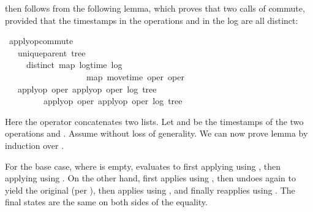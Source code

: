 \documentclass[sigconf]{acmart}
\renewenvironment{isabelle}{%
  \medbreak\noindent%
  \renewcommand{\isanewline}{\\}%
  \begin{minipage}{\columnwidth}%
  \begin{isabellebody}%
  \begin{tabbing}%
}{%
  \end{tabbing}%
  \end{isabellebody}%
  \end{minipage}%
  \medbreak%
}
\renewcommand{\isacartoucheopen}{}
\renewcommand{\isacartoucheclose}{}
\begin{document}
 then follows from the following lemma, which proves that two calls of  commute, provided that the timestamps in the operations and in the log are all distinct:
\begin{isabelle}
\isamarkupfalse%
\ apply{\isacharunderscore}op{\isacharunderscore}commute{}{\isacharcolon}\isanewline
\ \ \ {\isacartoucheopen}unique{\isacharunderscore}parent\ tree{\isacartoucheclose}\isanewline
\ \ \ \ \ {\isacartoucheopen}distinct\ {\isacharparenleft}{\isacharparenleft}map\ log{\isacharunderscore}time\ log{\isacharparenright}\ {\isacharat}\isanewline
\ \ \ \ \ \ \ \ \ \ \ \ \ \ \ \ \ \ \ {\isacharparenleft}map\ move{\isacharunderscore}time\ {\isacharbrackleft}oper{}{\isacharcomma}\ oper{}{\isacharbrackright}{\isacharparenright}{\isacharparenright}{\isacartoucheclose}\isanewline
\ \ \ {\isacartoucheopen}apply{\isacharunderscore}op\ oper{}\ {\isacharparenleft}apply{\isacharunderscore}op\ oper{}\ {\isacharparenleft}log{\isacharcomma}\ tree{\isacharparenright}{\isacharparenright}\ {\isacharequal}\isanewline
\ \ \ \ \ \ \ \ \ apply{\isacharunderscore}op\ oper{}\ {\isacharparenleft}apply{\isacharunderscore}op\ oper{}\ {\isacharparenleft}log{\isacharcomma}\ tree{\isacharparenright}{\isacharparenright}{\isacartoucheclose}
\end{isabelle}

\noindent Here the \isa{\isacharat} operator concatenates two lists.
Let  and  be the timestamps of the two operations  and .
Assume  without loss of generality.
We can now prove lemma  by induction over .

For the base case, where  is empty,  evaluates to first applying  using , then applying  using .
On the other hand,  first applies  using , then undoes  again to yield the original  (per ), then applies  using , and finally reapplies  using .
The final states are the same on both sides of the equality.
\end{document}
